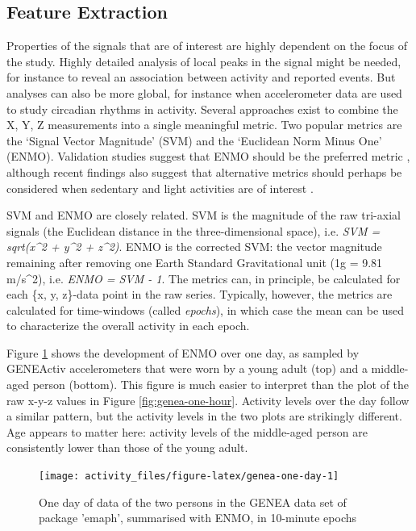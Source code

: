 \documentclass[]{book}
\begin{document}
\subsection{Feature Extraction}\label{feature-extraction}

 

Properties of the signals that are of interest are highly dependent on
the focus of the study. Highly detailed analysis of local peaks in the
signal might be needed, for instance to reveal an association between
activity and reported events. But analyses can also be more global, for
instance when accelerometer data are used to study circadian rhythms in
activity. Several approaches exist to combine the X, Y, Z measurements
into a single meaningful metric. Two popular metrics are the `Signal
Vector Magnitude' (SVM) and the `Euclidean Norm Minus One' (ENMO).
Validation studies suggest that ENMO should be the preferred metric
\citep{VanHees2014, VanHees2015}, although recent findings also suggest
that alternative metrics should perhaps be considered when sedentary and
light activities are of interest \citep{Bai2016}.

SVM and ENMO are closely related. SVM is the magnitude of the raw
tri-axial signals (the Euclidean distance in the three-dimensional
space), i.e. \emph{SVM = sqrt(x\^{}2 + y\^{}2 + z\^{}2)}. ENMO is the
corrected SVM: the vector magnitude remaining after removing one Earth
Standard Gravitational unit (1g = 9.81 m/s\^{}2), i.e. \emph{ENMO = SVM
- 1}. The metrics can, in principle, be calculated for each \{x, y,
z\}-data point in the raw series. Typically, however, the metrics are
calculated for time-windows (called \emph{epochs}), in which case the
mean can be used to characterize the overall activity in each epoch.

Figure \ref{fig:genea-one-day} shows the development of ENMO over one
day, as sampled by GENEActiv accelerometers that were worn by a young
adult (top) and a middle-aged person (bottom). This figure is much
easier to interpret than the plot of the raw x-y-z values in Figure
\ref{fig:genea-one-hour}. Activity levels over the day follow a similar
pattern, but the activity levels in the two plots are strikingly
different. Age appears to matter here: activity levels of the
middle-aged person are consistently lower than those of the young adult.

\begin{figure}

{\centering \texttt{[image: activity\_files/figure-latex/genea-one-day-1]} 

}

\caption{One day of data of the two persons in the GENEA data set of package 'emaph', summarised with ENMO, in 10-minute epochs}\label{fig:genea-one-day}
\end{figure}
\end{document}
